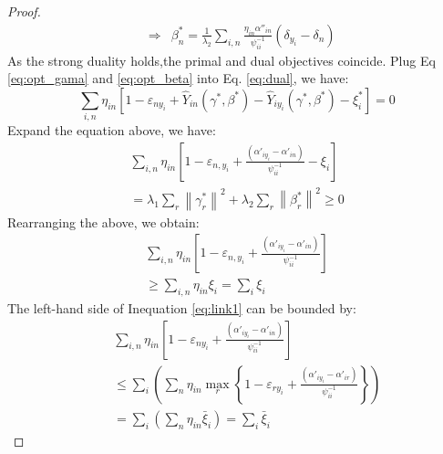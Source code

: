 \begin{proof}
\begin{eqnarray}
&\Rightarrow &\beta _n^* = \frac{1}{{{\lambda _2}}}\sum\limits_{i,n} {\frac{{{\eta _{in}}{{\alpha ''}_{in}}}}{{\psi _{ii}^{ - 1}}}\left( {{\delta _{{y_i}}} - {\delta _n}} \right)} 
\end{eqnarray}
As the strong duality holds,the primal and dual objectives coincide. Plug Eq \eqref{eq:opt_gama} and \eqref{eq:opt_beta} into Eq. \eqref{eq:dual}, we have:
\begin{equation*}
\sum\limits_{i,n} {{\eta _{in}}\left[ {1 - {\varepsilon _{n{y_i}}} + {{\hat Y}_{in}}\left( {\gamma^* ,\beta^* } \right) - {{\hat Y}_{i{y_i}}}\left( {\gamma^* ,\beta^* } \right) - {\xi _i^*}} \right]}=0
\end{equation*}
Expand the equation above, we have:
\begin{eqnarray}\nonumber
\sum\limits_{i,n} {{\eta _{in}}\left[ {1 - {\varepsilon _{n,{y_i}}} + \frac{{\left( {{{\alpha '}_{i{y_i}}} - {{\alpha '}_{in}}} \right)}}{{\psi_{ii}^{ - 1}}} - {\xi _i}} \right]} \nonumber\\ 
= {\lambda _1}\sum\limits_r {{{\left\| {\gamma _r^*} \right\|}^2}}  + {\lambda _2}\sum\limits_r {{{\left\| {\beta _r^*} \right\|}^2}}  \ge 0\nonumber
\end{eqnarray}
Rearranging the above, we obtain:
\begin{eqnarray}\label{eq:link1}
\sum\limits_{i,n} {{\eta _{in}}\left[ {1 - {\varepsilon _{n,{y_i}}} + \frac{{\left( {{{\alpha '}_{i{y_i}}} - {{\alpha '}_{in}}} \right)}}{{\psi_{ii}^{ - 1}}}} \right]} \nonumber\\ 
 \ge \sum\limits_{i,n} {{\eta _{in}}{\xi _i}}  = \sum\limits_i {{\xi _i}} 
\end{eqnarray}
The left-hand side of Inequation \eqref{eq:link1} can be bounded by:
\begin{eqnarray}
&&\sum\limits_{i,n} {{\eta _{in}}\left[ {1 - {\varepsilon _{n{y_i}}} + \frac{{\left( {{{\alpha '}_{i{y_i}}} - {{\alpha '}_{in}}} \right)}}{{\psi_{ii}^{ - 1}}}} \right]} \nonumber\\ &&\le \sum\limits_i {\left( {\sum\limits_n {{\eta _{in}}\mathop {\max }\limits_r \left\{ {1 - {\varepsilon _{r{y_i}}} + \frac{{\left( {{{\alpha '}_{i{y_i}}} - {{\alpha '}_{ir}}} \right)}}{{\psi_{ii}^{ - 1}}}} \right\}} } \right)}  \nonumber\\
&&= \sum\limits_i {\left( {\sum\limits_n {{\eta _{in}}{{\bar \xi }_i}} } \right)}  = \sum\limits_i {\bar \xi_i }
\end{eqnarray}
\end{proof}